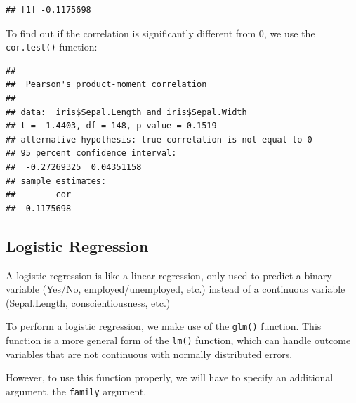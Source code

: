 \documentclass[
]{book}
\newenvironment{Shaded}{\begin{snugshade}}{\end{snugshade}}
\newcommand{\FunctionTok}[1]{\textcolor[rgb]{0.13,0.29,0.53}{\textbf{#1}}}
\newcommand{\NormalTok}[1]{#1}
\newcommand{\OtherTok}[1]{\textcolor[rgb]{0.56,0.35,0.01}{#1}}
\newcommand{\SpecialCharTok}[1]{\textcolor[rgb]{0.81,0.36,0.00}{\textbf{#1}}}
\begin{document}
\begin{Shaded}
\end{Shaded}

\begin{verbatim}
## [1] -0.1175698
\end{verbatim}

To find out if the correlation is significantly different from 0, we use the \texttt{cor.test()} function:

\begin{Shaded}
\end{Shaded}

\begin{verbatim}
## 
##  Pearson's product-moment correlation
## 
## data:  iris$Sepal.Length and iris$Sepal.Width
## t = -1.4403, df = 148, p-value = 0.1519
## alternative hypothesis: true correlation is not equal to 0
## 95 percent confidence interval:
##  -0.27269325  0.04351158
## sample estimates:
##        cor 
## -0.1175698
\end{verbatim}

\subsection{Logistic Regression}\label{logistic-regression}

A logistic regression is like a linear regression, only used to predict a binary variable (Yes/No, employed/unemployed, etc.) instead of a continuous variable (Sepal.Length, conscientiousness, etc.)

To perform a logistic regression, we make use of the \texttt{glm()} function. This function is a more general form of the \texttt{lm()} function, which can handle outcome variables that are not continuous with normally distributed errors.

However, to use this function properly, we will have to specify an additional argument, the \texttt{family} argument.
\end{document}
